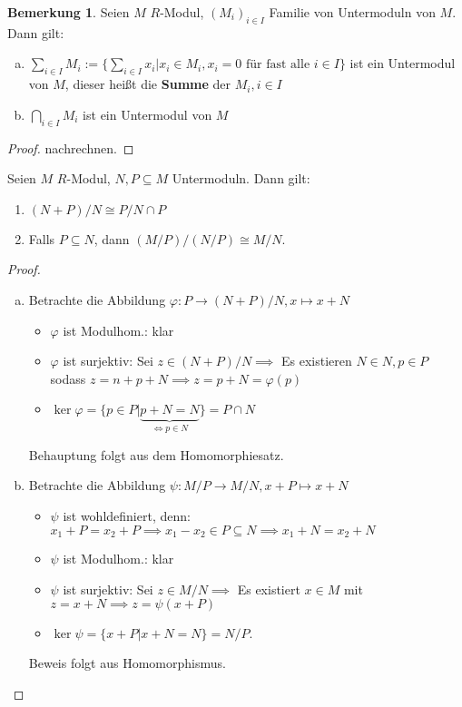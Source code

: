 \documentclass[a4paper, titlepage]{article}
\theoremstyle{definition}
\newtheorem{bem}[satz]{Bemerkung}
\begin{document}
        \begin{bem}
            Seien $M$ $R$-Modul, $(M_i)_{i\in I}$ Familie von Untermoduln von $M.$
            Dann gilt: 
            \begin{enumerate}[(a)]
                \item $\sum\limits_{i\in I}M_i:=\{\sum\limits_{i\in I}x_i|x_i \in M_i,x_i=0\text{ für fast alle }i\in I\}$ ist ein Untermodul von $M$, dieser heißt die \textbf{Summe} der $M_i,i\in I$
                \item $\bigcap\limits_{i\in I}M_i$ ist ein Untermodul von $M$
            \end{enumerate}
        \end{bem}
        \begin{proof}
            nachrechnen.
        \end{proof}
        \begin{satz}[Isomorphiesätze]
            Seien $M$ $R$-Modul, $N,P\subseteq M$ Untermoduln. Dann gilt:
            \begin{enumerate}
                \item $(N+P)/N\cong P/N\cap P$
                \item Falls $P\subseteq N$, dann $(M/P)/(N/P)\cong M/N.$
            \end{enumerate}
        \end{satz}
        \begin{proof}
            \begin{enumerate}[(a)]
                \item Betrachte die Abbildung $\varphi:P\longrightarrow (N+P)/N, x\mapsto x+N$
                \begin{itemize}
                    \item $\varphi$ ist Modulhom.: klar 
                    \item $\varphi$ ist surjektiv: Sei $z\in (N+P)/N\implies $ Es existieren $N\in N, p\in P$ sodass $z=n+p+N\implies z=p+N=\varphi(p)$
                    \item $\ker\varphi=\{p\in P|\underbrace{p+N=N}_{\Leftrightarrow p\in N}\}=P\cap N$
                \end{itemize}
                Behauptung folgt aus dem Homomorphiesatz.
                \item Betrachte die Abbildung $\psi: M/P\longrightarrow M/N, x+P\mapsto x+N$
                \begin{itemize}
                    \item $\psi$ ist wohldefiniert, denn: $x_1+P=x_2+P\implies x_1-x_2\in P\subseteq N\implies x_1+N=x_2+N$
                    \item $\psi$ ist Modulhom.: klar 
                    \item $\psi$ ist surjektiv: Sei $z\in M/N\implies $ Es existiert $x\in M $ mit $z=x+N\implies z=\psi(x+P)$
                    \item $\ker \psi=\{x+P|x+N=N\}=N/P.$
                \end{itemize}
                Beweis folgt aus Homomorphismus.
            \end{enumerate}
        \end{proof}
\end{document}

